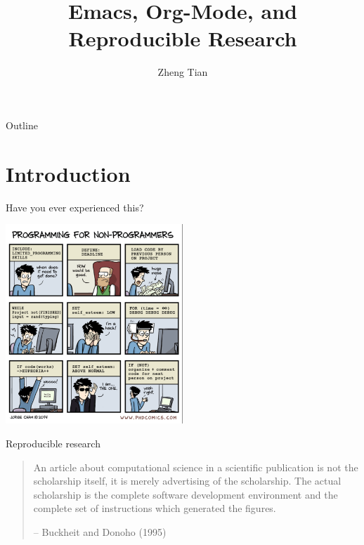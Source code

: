 \documentclass[presentation]{beamer}
\author{Zheng Tian}
\date{}
\title{Emacs, Org-Mode, and Reproducible Research}
\begin{document}
\maketitle
\begin{frame}{Outline}
\setcounter{tocdepth}{1}
\tableofcontents
\end{frame}


\section{Introduction}
\label{sec:org9718c8b}

\begin{frame}[label={sec:org78885db}]{Have you ever experienced this?}
\begin{center}
\includegraphics[width=0.5\textwidth]{figure/phdcomics.png}
\end{center}
\end{frame}

\begin{frame}[label={sec:orgc0955e5}]{Reproducible research}
\begin{quote}
An article about computational science in a scientific publication is
not the scholarship itself, it is merely advertising of the
scholarship. The actual scholarship is the complete software
development environment and the complete set of instructions which
generated the figures.

-- Buckheit and Donoho (1995)
\end{quote}
\end{frame}
\end{document}
